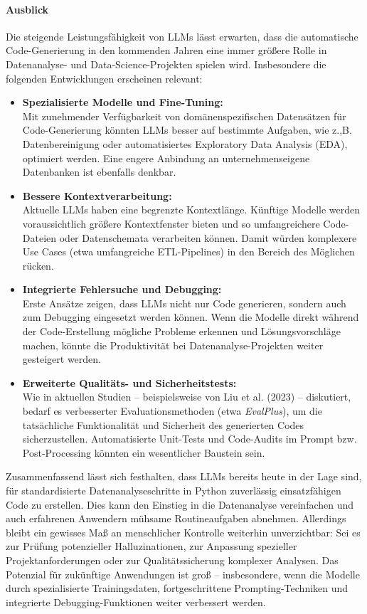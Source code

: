 \documentclass[11pt,a4paper]{article}
\begin{document}
\paragraph{Ausblick} Die steigende Leistungsfähigkeit von LLMs lässt erwarten, dass die automatische Code-Generierung in den kommenden Jahren eine immer größere Rolle in Datenanalyse- und Data-Science-Projekten spielen wird. Insbesondere die folgenden Entwicklungen erscheinen relevant:

\begin{itemize} 
    \item \textbf{Spezialisierte Modelle und Fine-Tuning:}\\Mit zunehmender Verfügbarkeit von domänenspezifischen Datensätzen für Code-Generierung könnten LLMs besser auf bestimmte Aufgaben, wie z.,B. Datenbereinigung oder automatisiertes Exploratory Data Analysis (EDA), optimiert werden. Eine engere Anbindung an unternehmenseigene Datenbanken ist ebenfalls denkbar.
    \item \textbf{Bessere Kontextverarbeitung:}\\Aktuelle LLMs haben eine begrenzte Kontextlänge. Künftige Modelle werden voraussichtlich größere Kontextfenster bieten und so umfangreichere Code-Dateien oder Datenschemata verarbeiten können. Damit würden komplexere Use Cases (etwa umfangreiche ETL-Pipelines) in den Bereich des Möglichen rücken.
    \item \textbf{Integrierte Fehlersuche und Debugging:}\\Erste Ansätze zeigen, dass LLMs nicht nur Code generieren, sondern auch zum Debugging eingesetzt werden können. Wenn die Modelle direkt während der Code-Erstellung mögliche Probleme erkennen und Lösungsvorschläge machen, könnte die Produktivität bei Datenanalyse-Projekten weiter gesteigert werden.
    \item \textbf{Erweiterte Qualitäts- und Sicherheitstests:}\\Wie in aktuellen Studien – beispielsweise von Liu et al. (2023) – diskutiert, bedarf es verbesserter Evaluationsmethoden (etwa \emph{EvalPlus}), um die tatsächliche Funktionalität und Sicherheit des generierten Codes sicherzustellen. Automatisierte Unit-Tests und Code-Audits im Prompt bzw. Post-Processing könnten ein wesentlicher Baustein sein.
\end{itemize}

\noindent Zusammenfassend lässt sich festhalten, dass LLMs bereits heute in der Lage sind, für standardisierte Datenanalyseschritte in Python zuverlässig einsatzfähigen Code zu erstellen. Dies kann den Einstieg in die Datenanalyse vereinfachen und auch erfahrenen Anwendern mühsame Routineaufgaben abnehmen. Allerdings bleibt ein gewisses Maß an menschlicher Kontrolle weiterhin unverzichtbar: Sei es zur Prüfung potenzieller Halluzinationen, zur Anpassung spezieller Projektanforderungen oder zur Qualitätssicherung komplexer Analysen. Das Potenzial für zukünftige Anwendungen ist groß – insbesondere, wenn die Modelle durch spezialisierte Trainingsdaten, fortgeschrittene Prompting-Techniken und integrierte Debugging-Funktionen weiter verbessert werden.
\end{document}
